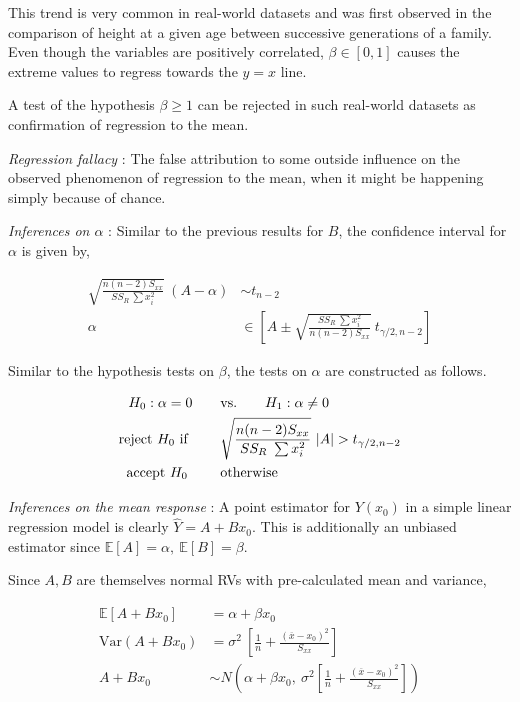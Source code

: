 This trend is very common in real-world datasets and was first observed in the comparison of height at a given age between successive generations of a family. Even though the variables are positively correlated, $ \beta \in [0, 1] $ causes the extreme values to regress towards the $ y = x $ line.

A test of the hypothesis $ \beta \geq 1 $ can be rejected in such real-world datasets as confirmation of regression to the mean.

\textit{Regression fallacy} : The false attribution to some outside influence on the observed phenomenon of regression to the mean, when it might be happening simply because of chance.

\textit{Inferences on $ \alpha $} : Similar to the previous results for $ B $, the confidence interval for $ \alpha $ is given by,

\begin{align}
	\sqrt{\frac{n(n-2) S_{xx}}{SS_R\ \sum x_i^2}}\ (A - \alpha) &\sim t_{n-2} \\
	\alpha &\in \left[ A \pm  \sqrt{\frac{SS_R\ \sum x_i^2}{n(n-2) S_{xx}}}\ t_{\gamma/2, n-2} \right] 
\end{align}

Similar to the hypothesis tests on $ \beta $, the tests on $ \alpha $ are constructed as follows. 

\begin{align}
	H_0 : \alpha = 0 \qquad &\text{vs.} \qquad H_1 : \alpha \neq 0 \nonumber \\
	\text{reject $ H_0 $ if } \qquad & \sqrt{\frac{n(n-2) S_{xx}}{SS_R\ \sum x_i^2}}\ |A| > t_{\gamma/2, n-2} \nonumber \\
	\text{accept $ H_0 $  } \qquad & \text{otherwise}
\end{align}

\textit{Inferences on the mean response} : A point estimator for $ Y(x_0) $ in a simple linear regression model is clearly $ \widehat{Y} = A + Bx_0$. This is additionally an unbiased estimator since $ \mathbb{E}[A] = \alpha,\ \mathbb{E}[B] = \beta $.

Since $ A, B $ are themselves normal RVs with pre-calculated mean and variance,

\begin{align}
	\mathbb{E}[A + B x_0] &= \alpha + \beta x_0 \\
	\mathrm{Var}(A + B x_0) &= \sigma^2\ \left[\frac{1}{n} + \frac{(\overline{x} - x_0)^2}{S_{xx}}\right] \\
	A + B x_0 &\sim N\left( \alpha + \beta x_0,\ \sigma^2 \left[\frac{1}{n} + \frac{(\overline{x} - x_0)^2}{S_{xx}} \right]\right)
\end{align}

